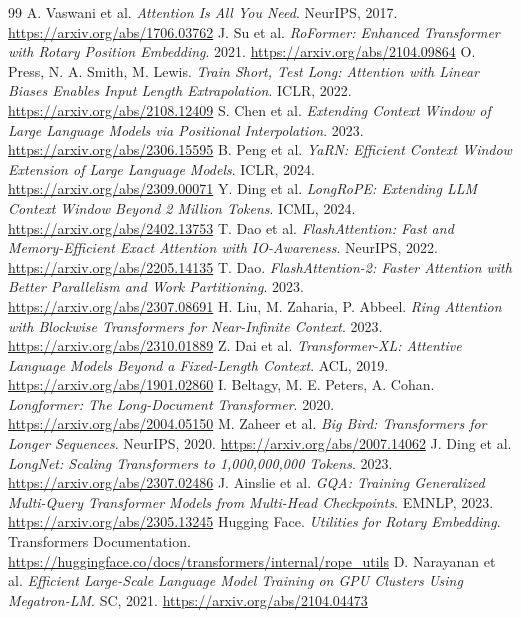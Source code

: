 \documentclass[UTF8,10pt,a4paper,fontset=none]{ctexart}
\begin{document}
\begin{thebibliography}{99}\small
{} A. Vaswani et al. \textit{Attention Is All You Need}. NeurIPS, 2017. \url{https://arxiv.org/abs/1706.03762}
 J. Su et al. \textit{RoFormer: Enhanced Transformer with Rotary Position Embedding}. 2021. \url{https://arxiv.org/abs/2104.09864}
 O. Press, N. A. Smith, M. Lewis. \textit{Train Short, Test Long: Attention with Linear Biases Enables Input Length Extrapolation}. ICLR, 2022. \url{https://arxiv.org/abs/2108.12409}
 S. Chen et al. \textit{Extending Context Window of Large Language Models via Positional Interpolation}. 2023. \url{https://arxiv.org/abs/2306.15595}
 B. Peng et al. \textit{YaRN: Efficient Context Window Extension of Large Language Models}. ICLR, 2024. \url{https://arxiv.org/abs/2309.00071}
 Y. Ding et al. \textit{LongRoPE: Extending LLM Context Window Beyond 2 Million Tokens}. ICML, 2024. \url{https://arxiv.org/abs/2402.13753}
 T. Dao et al. \textit{FlashAttention: Fast and Memory-Efficient Exact Attention with IO-Awareness}. NeurIPS, 2022. \url{https://arxiv.org/abs/2205.14135}
 T. Dao. \textit{FlashAttention-2: Faster Attention with Better Parallelism and Work Partitioning}. 2023. \url{https://arxiv.org/abs/2307.08691}
 H. Liu, M. Zaharia, P. Abbeel. \textit{Ring Attention with Blockwise Transformers for Near-Infinite Context}. 2023. \url{https://arxiv.org/abs/2310.01889}
 Z. Dai et al. \textit{Transformer-XL: Attentive Language Models Beyond a Fixed-Length Context}. ACL, 2019. \url{https://arxiv.org/abs/1901.02860}
 I. Beltagy, M. E. Peters, A. Cohan. \textit{Longformer: The Long-Document Transformer}. 2020. \url{https://arxiv.org/abs/2004.05150}
 M. Zaheer et al. \textit{Big Bird: Transformers for Longer Sequences}. NeurIPS, 2020. \url{https://arxiv.org/abs/2007.14062}
 J. Ding et al. \textit{LongNet: Scaling Transformers to 1,000,000,000 Tokens}. 2023. \url{https://arxiv.org/abs/2307.02486}
 J. Ainslie et al. \textit{GQA: Training Generalized Multi-Query Transformer Models from Multi-Head Checkpoints}. EMNLP, 2023. \url{https://arxiv.org/abs/2305.13245}
 Hugging Face. \textit{Utilities for Rotary Embedding}. Transformers Documentation. \url{https://huggingface.co/docs/transformers/internal/rope_utils}
 D. Narayanan et al. \textit{Efficient Large-Scale Language Model Training on GPU Clusters Using Megatron-LM}. SC, 2021. \url{https://arxiv.org/abs/2104.04473}

\end{thebibliography}
\end{document}
